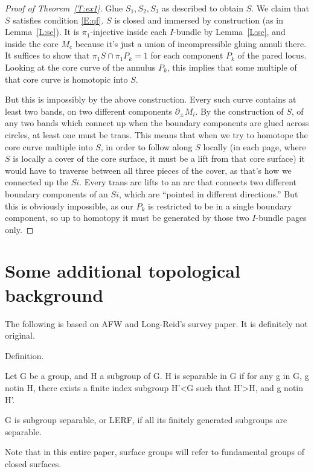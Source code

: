 \documentclass[12pt]{amsart}
\theoremstyle{definition}
\theoremstyle{remark}
\newcommand{\bd}{\partial}
\begin{document}
\begin{proof}[Proof of Theorem~\ref{T:ex1}]
Glue $S_1,S_2,S_3$ as described to obtain $S$. We claim that $S$ satisfies
condition \eqref{E:qf}. $S$ is closed and immersed by construction (as in
Lemma~\ref{L:sc}). It is $\pi_1$-injective inside each $I$-bundle by
Lemma~\ref{L:sc}, and inside the core $M_c$ because it's just a union of
incompressible gluing annuli there. It suffices to show that $\pi_1S \cap
\pi_1P_k = 1$ for each component $P_k$ of the pared locus. Looking at the core
curve of the annulus $P_k$, this implies that some multiple of that core curve
is homotopic into $S$.

But this is impossibly by the above construction. Every such curve contains at
least two bands, on two different components $\bd_\pm M_i$. By the construction
of $S$, of any two bands which connect up when the boundary components are
glued across circles, at least one must be trans. This means that when we try
to homotope the core curve multiple into $S$, in order to follow along $S$
locally (in each page, where $S$ is locally a cover of the core surface, it
must be a lift from that core surface) it would have to traverse between all
three pieces of the cover, as that's how we connected up the $Si$. Every trans
arc lifts to an arc that connects two different boundary components of an $Si$,
which are ``pointed in different directions.'' But this is obviously
impossible, as our $P_k$ is restricted to be in a single boundary component, so
up to homotopy it must be generated by those two $I$-bundle pages only.

\end{proof}

\section{Some additional topological background}

The following is based on AFW and Long-Reid's survey paper. It is definitely
not original.

Definition.

Let G be a group, and H a subgroup of G. H is separable in G if for any g in G,
g notin H, there exists a finite index subgroup H'<G such that H'>H, and
g notin H'.

G is subgroup separable, or LERF, if all its finitely generated subgroups are
separable.

Note that in this entire paper, surface groups will refer to fundamental groups
of closed surfaces.
\end{document}

